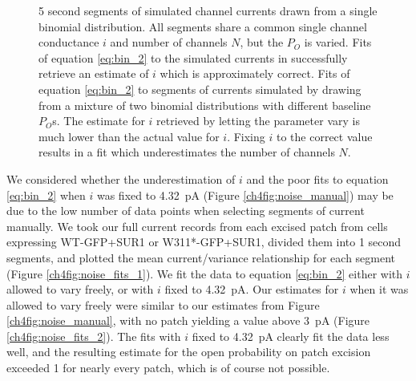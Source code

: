 \begin{figure}[h]
\begin{subfigure}[t]{0.3\textwidth}
	\end{subfigure}
	\caption[Simulated multibinomial currents]{
	 5 second segments of simulated channel currents drawn from a single binomial distribution.
	All segments share a common single channel conductance $i$ and number of channels $N$, but the $P_O$ is varied.
	 Fits of equation \ref{eq:bin_2} to the simulated currents in  successfully retrieve an estimate of $i$ which is approximately correct.
	 Fits of equation \ref{eq:bin_2} to segments of currents simulated by drawing from a mixture of two binomial distributions with different baseline $P_O$s.
	The estimate for $i$ retrieved by letting the parameter vary is much lower than the actual value for $i$.
	Fixing $i$ to the correct value results in a fit which underestimates the number of channels $N$.
	}\label{ch4fig:noise_sim}
\end{figure}

We considered whether the underestimation of $i$ and the poor fits to equation \ref{eq:bin_2} when $i$ was fixed to \SI{4.32}{\pico\ampere} (Figure \ref{ch4fig:noise_manual}) may be due to the low number of data points when selecting segments of current manually.
We took our full current records from each excised patch from cells expressing WT-GFP+SUR1 or W311*-GFP+SUR1, divided them into 1 second segments, and plotted the mean current/variance relationship for each segment (Figure \ref{ch4fig:noise_fits_1}).
We fit the data to equation \ref{eq:bin_2} either with $i$ allowed to vary freely, or with $i$ fixed to \SI{4.32}{\pico\ampere}.
Our estimates for $i$ when it was allowed to vary freely were similar to our estimates from Figure \ref{ch4fig:noise_manual}, with no patch yielding a value above \SI{3}{\pico\ampere} (Figure \ref{ch4fig:noise_fits_2}).
The fits with $i$ fixed to \SI{4.32}{\pico\ampere} clearly fit the data less well, and the resulting estimate for the open probability on patch excision exceeded 1 for nearly every patch, which is of course not possible.

